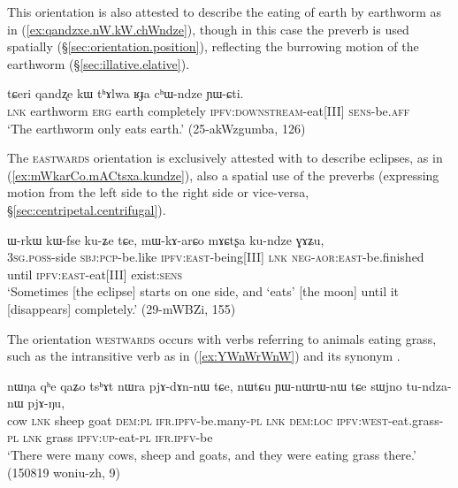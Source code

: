 This orientation is also attested to describe the eating of earth by earthworm as in (\ref{ex:qandzxe.nW.kW.chWndze}), though in this case the preverb is used spatially (§\ref{sec:orientation.position}), reflecting the burrowing motion of the earthworm (§\ref{sec:illative.elative}). 

\begin{exe}
\ex \label{ex:qandzxe.nW.kW.chWndze}
\gll tɕeri qandʐe kɯ tʰɤlwa ʁɟa cʰɯ-ndze ɲɯ-ɕti. \\
\textsc{lnk} earthworm \textsc{erg} earth completely \textsc{ipfv}:\textsc{downstream}-eat[III] \textsc{sens}-be.\textsc{aff} \\
\glt  `The earthworm only eats earth.' (25-akWzgumba, 126)
\end{exe}

The \textsc{eastwards} orientation is exclusively attested with  to describe eclipses, as in (\ref{ex:mWkarCo.mACtsxa.kundze}), also a spatial use of the preverbs (expressing motion from the left side to the right side or vice-versa, §\ref{sec:centripetal.centrifugal}).

\begin{exe}
\ex \label{ex:mWkarCo.mACtsxa.kundze}
\gll ɯ-rkɯ kɯ-fse ku-ʑe tɕe, mɯ-kɤ-arɕo mɤɕtʂa ku-ndze ɣɤʑu, \\
\textsc{3sg}.\textsc{poss}-side \textsc{sbj}:\textsc{pcp}-be.like \textsc{ipfv}:\textsc{east}-being[III] \textsc{lnk} \textsc{neg}-\textsc{aor}:\textsc{east}-be.finished until \textsc{ipfv}:\textsc{east}-eat[III] exist:\textsc{sens} \\
\glt  `Sometimes [the eclipse] starts on one side, and `eats' [the moon] until it [disappears] completely.' (29-mWBZi, 155)
\end{exe}

The orientation \textsc{westwards} occurs with verbs referring to animals eating grass, such as the intransitive verb  as in (\ref{ex:YWnWrWnW}) and its synonym .

\begin{exe}
\ex \label{ex:YWnWrWnW}
\gll  nɯŋa qʰe qaʑo tsʰɤt nɯra pjɤ-dɤn-nɯ tɕe, nɯtɕu ɲɯ-nɯrɯ-nɯ tɕe sɯjno tu-ndza-nɯ pjɤ-ŋu, \\
cow \textsc{lnk} sheep goat \textsc{dem}:\textsc{pl} \textsc{ifr}.\textsc{ipfv}-be.many-\textsc{pl} \textsc{lnk} \textsc{dem}:\textsc{loc} \textsc{ipfv}:\textsc{west}-eat.grass-\textsc{pl} \textsc{lnk} grass \textsc{ipfv}:\textsc{up}-eat-\textsc{pl} \textsc{ifr}.\textsc{ipfv}-be \\
\glt  `There were many cows, sheep and goats, and they were eating grass there.' (150819 woniu-zh, 9)
\end{exe}

